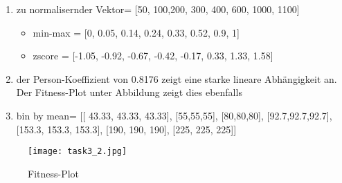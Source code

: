 \begin{enumerate}
	\item zu normalisernder Vektor= [50, 100,200, 300, 400, 600, 1000, 1100]
	\begin{itemize}
		\item min-max = [0, 0.05, 0.14, 0.24, 0.33, 0.52, 0.9, 1]
		\item zscore = [-1.05, -0.92, -0.67, -0.42, -0.17, 0.33, 1.33, 1.58]
	\end{itemize}
	\item der Person-Koeffizient von 0.8176 zeigt eine starke lineare Abhängigkeit an. Der Fitness-Plot unter Abbildung zeigt dies ebenfalls %
	\item bin by mean= [[ 43.33, 43.33, 43.33], [55,55,55], [80,80,80], [92.7,92.7,92.7], [153.3, 153.3, 153.3], [190, 190, 190], [225, 225, 225]]

\end{enumerate}

\begin{figure}[p]
	\centering
	\texttt{[image: task3\_2.jpg]}
	\caption{Fitness-Plot}
\end{figure}
